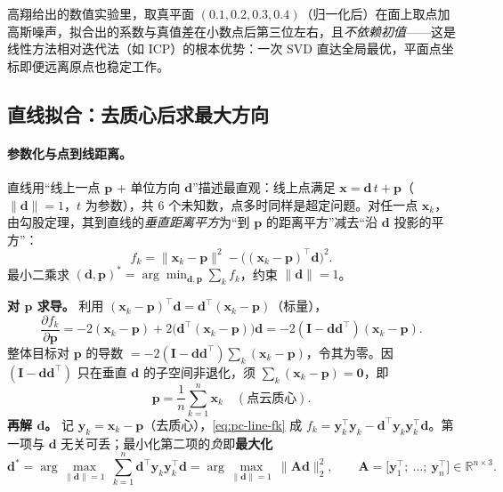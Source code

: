 \noindent 高翔给出的数值实验里，取真平面 $(0.1,0.2,0.3,0.4)$（归一化后）在面上取点加高斯噪声，拟合出的系数与真值差在小数点后第三位左右，且\emph{不依赖初值}——这是线性方法相对迭代法（如 ICP）的根本优势：一次 SVD 直达全局最优，平面点坐标即便远离原点也稳定工作\cite{gao2023slamad}。

\subsection{直线拟合：去质心后求最大方向}
\label{sec:pc-fit-line}

\paragraph{参数化与点到线距离。}
直线用“线上一点 $\mathbf{p}$ + 单位方向 $\mathbf{d}$”描述最直观：线上点满足 $\mathbf{x}=\mathbf{d}\,t+\mathbf{p}$（$\|\mathbf{d}\|=1$，$t$ 为参数），共 $6$ 个未知数，点多时同样是超定问题。对任一点 $\mathbf{x}_k$，由勾股定理，其到直线的\emph{垂直距离平方}为“到 $\mathbf{p}$ 的距离平方”减去“沿 $\mathbf{d}$ 投影的平方”：
\begin{equation}
  f_k=\|\mathbf{x}_k-\mathbf{p}\|^2-\big((\mathbf{x}_k-\mathbf{p})^\top\mathbf{d}\big)^2 .
  \label{eq:pc-line-fk}
\end{equation}
最小二乘求 $(\mathbf{d},\mathbf{p})^\ast=\arg\min_{\mathbf{d},\mathbf{p}}\sum_k f_k$，约束 $\|\mathbf{d}\|=1$。

\begin{derivation}
\textbf{对 $\mathbf{p}$ 求导。} 利用 $(\mathbf{x}_k-\mathbf{p})^\top\mathbf{d}=\mathbf{d}^\top(\mathbf{x}_k-\mathbf{p})$（标量），
\begin{equation}
  \frac{\partial f_k}{\partial\mathbf{p}}
  =-2(\mathbf{x}_k-\mathbf{p})+2\big(\mathbf{d}^\top(\mathbf{x}_k-\mathbf{p})\big)\mathbf{d}
  =-2(\mathbf{I}-\mathbf{d}\mathbf{d}^\top)(\mathbf{x}_k-\mathbf{p}).
  \label{eq:pc-line-dfdp}
\end{equation}
整体目标对 $\mathbf{p}$ 的导数 $=-2(\mathbf{I}-\mathbf{d}\mathbf{d}^\top)\sum_k(\mathbf{x}_k-\mathbf{p})$，令其为零。因 $(\mathbf{I}-\mathbf{d}\mathbf{d}^\top)$ 只在垂直 $\mathbf{d}$ 的子空间非退化，须 $\sum_k(\mathbf{x}_k-\mathbf{p})=\mathbf{0}$，即
\begin{equation}
  \mathbf{p}=\frac{1}{n}\sum_{k=1}^{n}\mathbf{x}_k\quad(\text{点云质心}).
  \label{eq:pc-line-p}
\end{equation}
\textbf{再解 $\mathbf{d}$。} 记 $\mathbf{y}_k=\mathbf{x}_k-\mathbf{p}$（去质心），\cref{eq:pc-line-fk} 成 $f_k=\mathbf{y}_k^\top\mathbf{y}_k-\mathbf{d}^\top\mathbf{y}_k\mathbf{y}_k^\top\mathbf{d}$。第一项与 $\mathbf{d}$ 无关可丢；最小化第二项的\emph{负}即\textbf{最大化}
\begin{equation}
  \mathbf{d}^\ast=\arg\max_{\|\mathbf{d}\|=1}\ \sum_{k=1}^{n}\mathbf{d}^\top\mathbf{y}_k\mathbf{y}_k^\top\mathbf{d}
  =\arg\max_{\|\mathbf{d}\|=1}\ \|\mathbf{A}\mathbf{d}\|_2^2,
  \qquad \mathbf{A}=\big[\mathbf{y}_1^\top;\ \dots;\ \mathbf{y}_n^\top\big]\in\mathbb{R}^{n\times3}.
  \label{eq:pc-line-d}
\end{equation}
\end{derivation}

